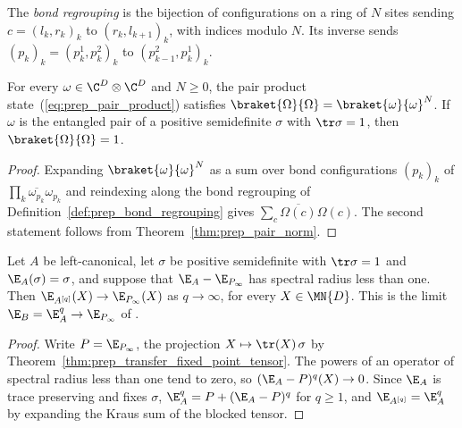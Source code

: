 \begin{definition}
    \label{def:prep_bond_regrouping}
    \leanok
    The \emph{bond regrouping} is the bijection of configurations on a ring of
    $N$ sites sending $c=(l_k,r_k)_k$ to $(r_k,l_{k+1})_k$, with indices
    modulo $N$. Its inverse sends $(p_k)_k=(p_k^1,p_k^2)_k$ to
    $(p_{k-1}^2,p_k^1)_k$.
\end{definition}

\begin{theorem}
    \label{thm:prep_pair_product_norm}
    \leanok
    For every $\omega\in\C^D\otimes\C^D$ and $N\ge0$, the pair product
    state~(\ref{eq:prep_pair_product}) satisfies
    $\braket{\Omega}{\Omega}=\braket{\omega}{\omega}^N$. If $\omega$ is the
    entangled pair of a positive semidefinite $\sigma$ with $\tr\sigma=1$,
    then $\braket{\Omega}{\Omega}=1$.
\end{theorem}
\begin{proof}
    \leanok
    Expanding $\braket{\omega}{\omega}^N$ as a sum over bond configurations
    $(p_k)_k$ of $\prod_k\overline{\omega_{p_k}}\omega_{p_k}$ and
    reindexing along the bond regrouping of
    Definition~\ref{def:prep_bond_regrouping} gives
    $\sum_c\overline{\Omega(c)}\Omega(c)$. The second statement follows
    from Theorem~\ref{thm:prep_pair_norm}.
\end{proof}

\begin{theorem}
    \label{thm:prep_blocked_transfer_limit_gap}
    \leanok
    Let $A$ be left-canonical, let $\sigma$ be positive semidefinite with
    $\tr\sigma=1$ and $\E_A(\sigma)=\sigma$, and suppose that
    $\E_A-\E_{P_\infty}$ has spectral radius less than one. Then
    $\E_{A^{[q]}}(X)\to\E_{P_\infty}(X)$ as $q\to\infty$, for every
    $X\in\MN{D}$. This is the limit $\E_B=\E_A^q\to\E_{P_\infty}$ of
    \cite{Malz2024Preparation}.
\end{theorem}
\begin{proof}
    \leanok
    Write $P=\E_{P_\infty}$, the projection $X\mapsto\tr(X)\,\sigma$ by
    Theorem~\ref{thm:prep_transfer_fixed_point_tensor}. The powers of an
    operator of spectral radius less than one tend to zero, so
    $(\E_A-P)^q(X)\to0$. Since $\E_A$ is trace preserving and fixes
    $\sigma$, $\E_A^q=P+(\E_A-P)^q$ for $q\ge1$, and
    $\E_{A^{[q]}}=\E_A^q$ by expanding the Kraus sum of the blocked tensor.
\end{proof}

